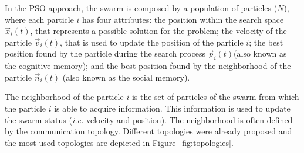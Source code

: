 In the PSO approach, the swarm is composed by a population of particles ($N$), where each particle $i$ has four attributes: the position within the search space $\vec x_i(t)$, that represents a possible solution for the problem; the velocity of the particle $\vec v_i(t)$, that is used to update the position of the particle $i$; the best position found by the particle during the search process $\vec p_i(t)$(also known as the cognitive memory); and the best position found by the neighborhood of the particle $\vec n_i(t)$ (also known as the social memory).

The neighborhood of the particle $i$ is the set of particles of the swarm from which the particle $i$ is able to acquire information. This information is used to update the swarm status (\textit{i.e.} velocity and position). The neighborhood is often defined by the communication topology. Different topologies were already proposed \cite{PSO:KennedyA}\cite{PSO:KennedyB} and the most used topologies are depicted in Figure~\ref{fig:topologies}.

